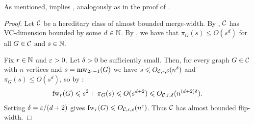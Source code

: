    As mentioned,  implies ,
   analogously as in the proof of .


\thmabmw*
\begin{proof}
    Let $\mathcal C$ be a hereditary class of almost bounded merge-width.
    By , $\mathcal C$  has VC-dimension bounded by some $d\in\mathbb N$.
By , we have that $\pi_G(s)\le O(s^d)$ for all $G\in\mathcal C$ and $s\in\mathbb N$.

Fix $r\in\mathbb N$ and $\varepsilon>0$. Let $\delta>0$ be sufficiently small.
Then, for every graph $G\in\mathcal C$ with $n$ vertices and  $s=\operatorname{mw}_{2r-1}(G)$ 
we have $s\leqslant O_{\mathcal C,r,\delta}(n^\delta)$ and $\pi_G(s)\le O(s^d)$, so by :
$$\operatorname{fw}_r(G)\leqslant s^2+\pi_G(s)\leqslant  O(s^{d+2})\leqslant  O_{\mathcal C,r,\delta}(n^{(d+2)\delta}).$$
Setting $\delta=\varepsilon/(d+2)$ gives $\operatorname{fw}_r(G)\leqslant O_{\mathcal C,r,\varepsilon}(n^\varepsilon)$. Thus $\mathcal C$ has almost bounded flip-width.
\end{proof}






